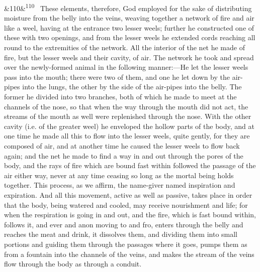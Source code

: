 \documentclass[12pt]{article}
\newcommand{\para}[1][]{\par\noindent\ifx&#1&\else\textsuperscript{\footnotesize #1}~\fi}
\begin{document}
\para[110] These elements, therefore, God employed for the sake of distributing moisture from the belly into the veins, weaving together a network of fire and air like a weel, having at the entrance two lesser weels; further he constructed one of these with two openings, and from the lesser weels he extended cords reaching all round to the extremities of the network. All the interior of the net he made of fire, but the lesser weels and their cavity, of air. The network he took and spread over the newly-formed animal in the following manner:---He let the lesser weels pass into the mouth; there were two of them, and one he let down by the air-pipes into the lungs, the other by the side of the air-pipes into the belly. The former he divided into two branches, both of which he made to meet at the channels of the nose, so that when the way through the mouth did not act, the streams of the mouth as well were replenished through the nose. With the other cavity (i.e. of the greater weel) he enveloped the hollow parts of the body, and at one time he made all this to flow into the lesser weels, quite gently, for they are composed of air, and at another time he caused the lesser weels to flow back again; and the net he made to find a way in and out through the pores of the body, and the rays of fire which are bound fast within followed the passage of the air either way, never at any time ceasing so long as the mortal being holds together. This process, as we affirm, the name-giver named inspiration and expiration. And all this movement, active as well as passive, takes place in order that the body, being watered and cooled, may receive nourishment and life; for when the respiration is going in and out, and the fire, which is fast bound within, follows it, and ever and anon moving to and fro, enters through the belly and reaches the meat and drink, it dissolves them, and dividing them into small portions and guiding them through the passages where it goes, pumps them as from a fountain into the channels of the veins, and makes the stream of the veins flow through the body as through a conduit.
\end{document}
